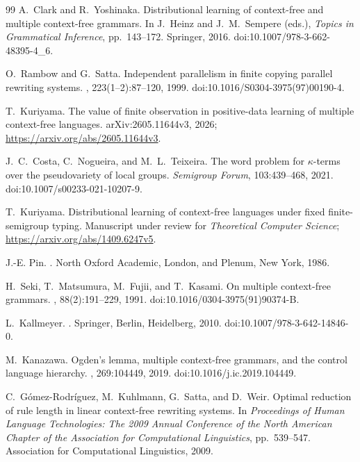 \documentclass[11pt]{article}
\numberwithin{equation}{section}
\theoremstyle{plain}
\theoremstyle{definition}
\theoremstyle{remark}
\theoremstyle{plain}
\begin{document}
\begin{thebibliography}{99}
A.~Clark and R.~Yoshinaka.
\newblock Distributional learning of context-free and multiple context-free grammars.
\newblock In J.~Heinz and J.~M.~Sempere (eds.), \emph{Topics in Grammatical
Inference}, pp.~143--172. Springer, 2016.
\newblock doi:10.1007/978-3-662-48395-4\_6.

O.~Rambow and G.~Satta.
\newblock Independent parallelism in finite copying parallel rewriting systems.
, 223(1--2):87--120, 1999.
\newblock doi:10.1016/S0304-3975(97)00190-4.

T.~Kuriyama.
\newblock The value of finite observation in positive-data learning
of multiple context-free languages.
\newblock arXiv:2605.11644v3, 2026;
\url{https://arxiv.org/abs/2605.11644v3}.

J.~C.~Costa, C.~Nogueira, and M.~L.~Teixeira.
\newblock The word problem for $\kappa$-terms over the
pseudovariety of local groups.
\newblock \emph{Semigroup Forum}, 103:439--468, 2021.
\newblock doi:10.1007/s00233-021-10207-9.

T.~Kuriyama.
\newblock Distributional learning of context-free languages under fixed
finite-semigroup typing.
\newblock Manuscript under review for \emph{Theoretical Computer Science};
\url{https://arxiv.org/abs/1409.6247v5}.

J.-E. Pin.
.
\newblock North Oxford Academic, London, and Plenum, New York, 1986.

H.~Seki, T.~Matsumura, M.~Fujii, and T.~Kasami.
\newblock On multiple context-free grammars.
, 88(2):191--229, 1991.
\newblock doi:10.1016/0304-3975(91)90374-B.

L.~Kallmeyer.
.
\newblock Springer, Berlin, Heidelberg, 2010.
\newblock doi:10.1007/978-3-642-14846-0.

M.~Kanazawa.
\newblock Ogden's lemma, multiple context-free grammars, and the control language hierarchy.
, 269:104449, 2019.
\newblock doi:10.1016/j.ic.2019.104449.

C.~G\'omez-Rodr\'iguez, M.~Kuhlmann, G.~Satta, and D.~Weir.
\newblock Optimal reduction of rule length in linear context-free rewriting systems.
\newblock In {\em Proceedings of Human Language Technologies: The 2009 Annual
Conference of the North American Chapter of the Association for Computational
Linguistics}, pp.~539--547. Association for Computational Linguistics, 2009.


\end{thebibliography}
\end{document}
